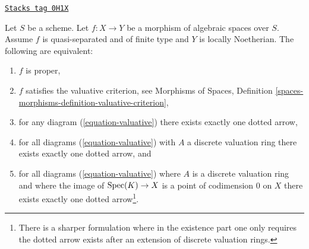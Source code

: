 \begin{lemma}
\label{spaces-limits-lemma-Noetherian-dvr-valuative-proper}
\href{https://stacks.math.columbia.edu/tag/0H1X}{\texttt{Stacks tag 0H1X}}

Let $S$ be a scheme. Let $f : X \to Y$ be a morphism of algebraic spaces
over $S$. Assume $f$ is quasi-separated and of finite type and $Y$
is locally Noetherian. The following are equivalent:
\begin{enumerate}
\item $f$ is proper,
\item $f$ satisfies the valuative criterion, see
Morphisms of Spaces, Definition
\ref{spaces-morphisms-definition-valuative-criterion},
\item for any diagram (\ref{equation-valuative}) there exists exactly
one dotted arrow,
\item for all diagrams (\ref{equation-valuative}) with $A$ a discrete
valuation ring there exists exactly one dotted arrow, and
\item for all diagrams (\ref{equation-valuative}) where $A$ is a discrete
valuation ring and where the image of $\operatorname{Spec}(K) \to X$ is a point of
codimension $0$ on $X$ there exists exactly one dotted arrow\footnote{There is
a sharper formulation where in the existence part one only requires
the dotted arrow exists after an extension of discrete valuation rings.}.
\end{enumerate}
\end{lemma}

